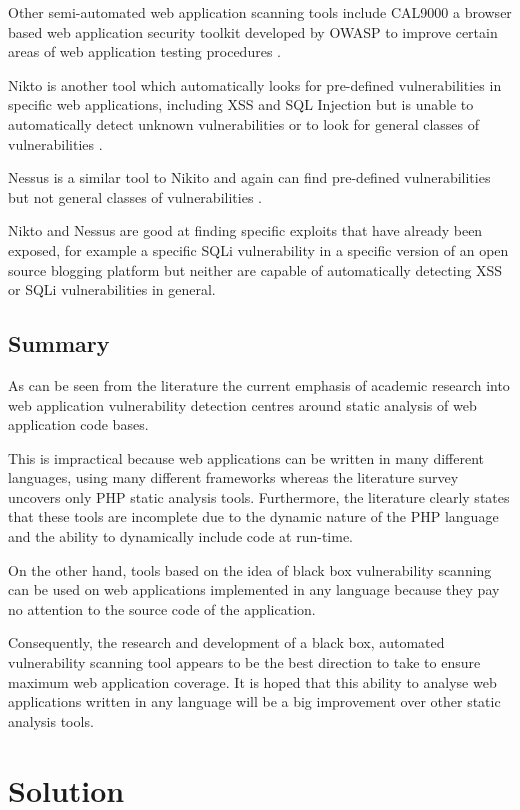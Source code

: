\documentclass[12pt,a4paper]{article}
\begin{document}
Other semi-automated web application scanning tools include CAL9000 \cite{Loomis:2009:Online} a browser based web application security toolkit developed by OWASP to improve certain areas of web application testing procedures \cite{Grossman2007}.

Nikto is another tool which automatically looks for pre-defined vulnerabilities in specific web applications, including XSS and SQL Injection but is unable to automatically detect unknown vulnerabilities or to look for general classes of vulnerabilities \cite{Nikto:2009:Online}.

Nessus is a similar tool to Nikito and again can find pre-defined vulnerabilities but not general classes of vulnerabilities \cite{Nessus:2010:Online}.

Nikto and Nessus are good at finding specific exploits that have already been exposed, for example a specific SQLi vulnerability in a specific version of an open source blogging platform but neither are capable of automatically detecting XSS or SQLi vulnerabilities in general.

\subsection{Summary}
As can be seen from the literature the current emphasis of academic research into web application vulnerability detection centres around static analysis of web application code bases.

This is impractical because web applications can be written in many different languages, using many different frameworks whereas the literature survey uncovers only PHP static analysis tools.  Furthermore, the literature clearly states that these tools are incomplete due to the dynamic nature of the PHP language and the ability to dynamically include code at run-time.

On the other hand, tools based on the idea of black box vulnerability scanning can be used on web applications implemented in any language because they pay no attention to the source code of the application.

Consequently, the research and development of a black box, automated vulnerability scanning tool appears to be the best direction to take to ensure maximum web application coverage.  It is hoped that this ability to analyse web applications written in any language will be a big improvement over other static analysis tools.

\section{Solution}
\end{document}
